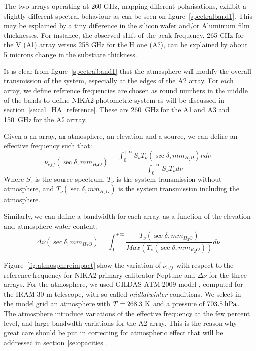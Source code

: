 The two arrays operating at 260 GHz, mapping different polarisations,
exhibit a slightly different spectral behaviour as can be
seen on figure~\ref{spectralband1}. This may be explained by a tiny
difference in the silicon wafer and/or Aluminium film thicknesses. For
instance, the observed shift of the peak frequency, 265 GHz for the V
(A1) array versus 258 GHz for the H one (A3), can be explained by
about 5 microns change in the substrate thickness. 

It is clear from figure~\ref{spectralband1} that the atmosphere will
modify the overall transmission of the system, especially at the edges
of the A2 array. For each array, we define reference frequencies are chosen
as round numbers in the middle of the bands to define NIKA2
photometric system as will be discussed in
section~\ref{se:cal_HA_reference}. These are 260~GHz for the A1 and A3 and
150~GHz for the A2 arrray.

Given a an array, an atmosphere, an elevation and a source, we can
define an effective frequency such that:
\begin{equation}
\nu_{eff}( \sec \delta, mm_{H_{2}O}) = \frac{ \int_{0}^{+\infty} S_{\nu}
  T_{\nu}(\sec \delta, mm_{H_{2}O}) \nu d\nu } { \int_{0}^{+\infty} S_{\nu} T_{\nu} d\nu}
\label{eq:nueff0}
\end{equation}
Where $S_{\nu}$ is the source spectrum, $T_{\nu}$ is the system
transmission without atmosphere, and $T_{\nu}(\sec \delta,
mm_{H_{2}O})$ is the system transmission including the atmosphere.

Similarly, we can define a bandwidth for each array, as a function of
the elevation and atmosphere water content.
\begin{equation}
\Delta\nu ( \sec \delta, mm_{H_{2}O}) = \int_{0}^{+\infty} \frac{T_{\nu}( \sec \delta, mm_{H_{2}O})}{Max(T_{\nu}( \sec \delta, mm_{H_{2}O}))}d\nu
\end{equation}

Figure~\ref{fig:atmosphereimpact} show the variation of $\nu_{eff}$
with respect to the reference frequency for NIKA2 primary calibrator Neptune and $\Delta\nu$ for the three
arrays. For the atmosphere, we used GILDAS ATM 2009 model \cite{ATM}, computed for
the IRAM 30-m telescope, with so called {\it midlatwinter} conditions. We select in the model
grid an atmosphere with $T=268.3 \ {\rm K}$ and a pressure of $703.5 \
{\rm hPa}$. The atmosphere introduce variations of the effective
frequency at the few percent level, and large bandwdth variations for
the A2 array. This is the reason why great care should be put in
correcting for atmospheric effect that will be addressed in section~\ref{se:opacities}.



